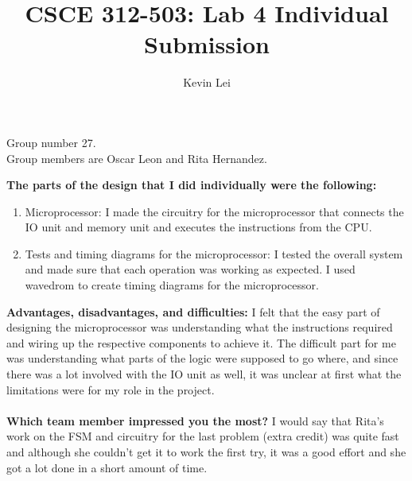 \documentclass{article}
\title{CSCE 312-503: Lab 4 Individual Submission}
\author{Kevin Lei}
\begin{document}
\maketitle
\begin{center}Group number 27. \\ Group members are Oscar Leon and Rita Hernandez.\end{center}

\vspace{1cm}

\noindent
\textbf{The parts of the design that I did individually were the following:}
\begin{enumerate}[1.]
    \item Microprocessor: I made the circuitry for the microprocessor that connects the IO unit and memory unit and executes the instructions from the CPU.
    \item Tests and timing diagrams for the microprocessor: I tested the overall system and made sure that each operation was working as expected. I used wavedrom to create timing diagrams for the microprocessor.
\end{enumerate}

\noindent
\textbf{Advantages, disadvantages, and difficulties:}
I felt that the easy part of designing the microprocessor was understanding what the instructions required and wiring up the respective components to achieve it.
The difficult part for me was understanding what parts of the logic were supposed to go where, and since there was a lot involved with the IO unit as well, it was unclear at first what the limitations were for my role in the project. 
\\ \\
\noindent
\textbf{Which team member impressed you the most?}
I would say that Rita's work on the FSM and circuitry for the last problem (extra credit) was quite fast and although she couldn't get it to work the first try, it was a good effort and she got a lot done in a short amount of time.
\end{document}

